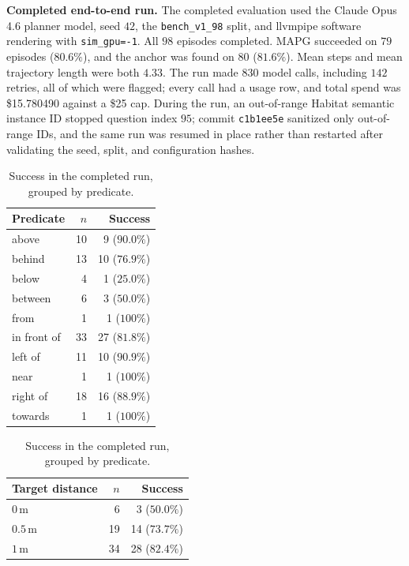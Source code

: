 \textbf{Completed end-to-end run.}
The completed evaluation used the Claude Opus 4.6 planner model, seed $42$, the \texttt{bench\_v1\_98} split, and llvmpipe software rendering with \texttt{sim\_gpu=-1}. All $98$ episodes completed. MAPG succeeded on $79$ episodes ($80.6\%$), and the anchor was found on $80$ ($81.6\%$). Mean steps and mean trajectory length were both $4.33$. The run made $830$ model calls, including $142$ retries, all of which were flagged; every call had a usage row, and total spend was \$15.780490 against a \$25 cap.
During the run, an out-of-range Habitat semantic instance ID stopped question index $95$; commit \texttt{c1b1ee5e} sanitized only out-of-range IDs, and the same run was resumed in place rather than restarted after validating the seed, split, and configuration hashes.

\begin{table}[t]
\centering
\small
\begin{minipage}[t]{0.48\textwidth}
\centering
\begin{tabular}{lrr}
\toprule
\textbf{Predicate} & \textbf{$n$} & \textbf{Success} \\
\midrule
above       & 10 & 9 ($90.0\%$) \\
behind      & 13 & 10 ($76.9\%$) \\
below       & 4  & 1 ($25.0\%$) \\
between     & 6  & 3 ($50.0\%$) \\
from        & 1  & 1 ($100\%$) \\
in front of & 33 & 27 ($81.8\%$) \\
left of     & 11 & 10 ($90.9\%$) \\
near        & 1  & 1 ($100\%$) \\
right of    & 18 & 16 ($88.9\%$) \\
towards     & 1  & 1 ($100\%$) \\
\bottomrule
\end{tabular}
\caption{Success in the completed run, grouped by predicate.}
\label{tab:predicate_success}
\end{minipage}
\hfill
\begin{minipage}[t]{0.48\textwidth}
\centering
\begin{tabular}{lrr}
\toprule
\textbf{Target distance} & \textbf{$n$} & \textbf{Success} \\
\midrule
$0\,\mathrm{m}$   & 6  & 3 ($50.0\%$) \\
$0.5\,\mathrm{m}$ & 19 & 14 ($73.7\%$) \\
$1\,\mathrm{m}$   & 34 & 28 ($82.4\%$) \\

\end{tabular}
\end{minipage}
\end{table}
